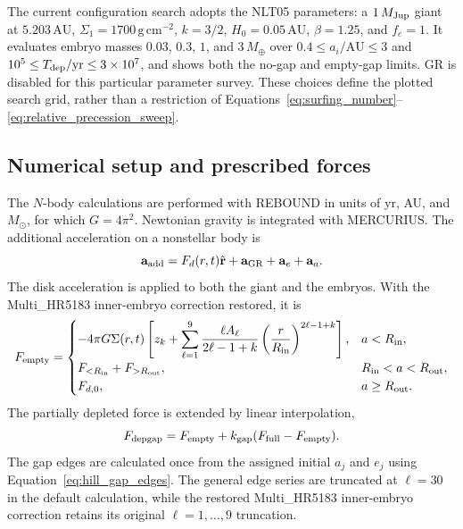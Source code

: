 The current configuration search adopts the NLT05 parameters: a
$1\,M_{\rm Jup}$ giant at $5.203\,\mathrm{AU}$,
$\Sigma_1=1700\,\mathrm{g\,cm^{-2}}$, $k=3/2$,
$H_0=0.05\,\mathrm{AU}$, $\beta=1.25$, and $f_e=1$. It evaluates embryo
masses $0.03$, $0.3$, $1$, and $3\,M_\oplus$ over
$0.4\leq a_i/\mathrm{AU}\leq3$ and
$10^5\leq T_{\rm dep}/\mathrm{yr}\leq3\times10^7$, and shows both the
no-gap and empty-gap limits. GR is disabled for this particular parameter
survey. These choices define the plotted search grid, rather than a
restriction of Equations~\ref{eq:surfing_number}--
\ref{eq:relative_precession_sweep}.

\subsection{Numerical setup and prescribed forces}

The $N$-body calculations are performed with REBOUND in units of yr, AU,
and $M_\odot$, for which $G=4\pi^2$. Newtonian gravity is integrated with
MERCURIUS. The additional acceleration on a nonstellar body is
\begin{equation}
    \mathbf a_{\rm add}=F_d(r,t)\hat{\mathbf r}
    +\mathbf a_{\rm GR}+\mathbf a_e+\mathbf a_a.
\label{eq:additional_acceleration}
\end{equation}
The disk acceleration is applied to both the giant and the embryos. With the
Multi\_HR5183 inner-embryo correction restored, it is
\begin{equation}
F_{\rm empty}=\begin{cases}
-4\pi G\Sigma(r,t)\left[z_k+\displaystyle\sum_{\ell=1}^{9}
\frac{\ell A_\ell}{2\ell-1+k}
\left(\frac{r}{R_{\rm in}}\right)^{2\ell-1+k}\right],&a<R_{\rm in},\\
F_{<R_{\rm in}}+F_{>R_{\rm out}},&R_{\rm in}<a<R_{\rm out},\\
F_{d,0},&a\geq R_{\rm out}.
\end{cases}
\label{eq:empty_gap_force}
\end{equation}
The partially depleted force is extended by linear interpolation,
\begin{equation}
    F_{\rm depgap}=F_{\rm empty}
    +k_{\rm gap}(F_{\rm full}-F_{\rm empty}).
\label{eq:depleted_gap_force}
\end{equation}
The gap edges are calculated once from the assigned initial $a_j$ and $e_j$
using Equation~\ref{eq:hill_gap_edges}. The general edge series are truncated
at $\ell=30$ in the default calculation, while the restored Multi\_HR5183
inner-embryo correction retains its original $\ell=1,\ldots,9$ truncation.

